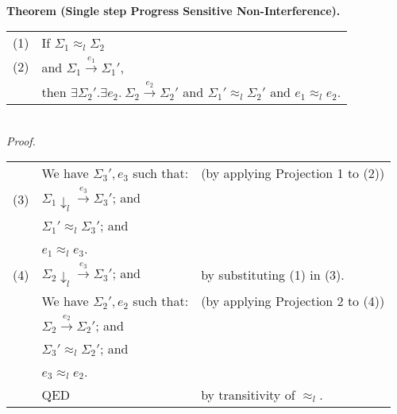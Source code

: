 \documentclass{article}
\newcommand{\ssteparrow}[1]{\overset{#1}{\longrightarrow}}
\newcommand{\sstep}[3]{#2\ssteparrow{#1}#3}
\newcommand{\proj}[2]{#1{\downarrow_{#2}}}
\newcommand{\lequiv}[3]{#2\approx_{#1}#3}
\begin{document}
\\
\textbf{Theorem (Single step Progress Sensitive Non-Interference).}
\\
\begin{tabular}{l@{$\qquad$}l}
  (1) & If $\lequiv{l}{\Sigma_1}{\Sigma_2}$
\\
  (2) & and $\sstep{e_1}{\Sigma_1}{\Sigma_1'}$,
\\
      & then $\exists \Sigma_2'.\exists e_2.~\sstep{e_2}{\Sigma_2}{\Sigma_2'}$
        and $\lequiv{l}{\Sigma_1'}{\Sigma_2'}$
        and $\lequiv{l}{e_1}{e_2}$.
\end{tabular}
\\
\textit{Proof.}
\\
\begin{tabular}{l@{$\qquad$}l@{\qquad}l}
      & We have $\Sigma_3',e_3$ such that:
      & (by applying Projection 1 to (2))
\\
  (3) & $\sstep{e_3}{\proj{\Sigma_1}{l}}{\Sigma_3'}$; and
\\
      & $\lequiv{l}{\Sigma_1'}{\Sigma_3'}$; and
\\
      & $\lequiv{l}{e_1}{e_3}$.
\\
  (4) & $\sstep{e_3}{\proj{\Sigma_2}{l}}{\Sigma_3'}$; and
      & by substituting (1) in (3).
\\
      & We have $\Sigma_2',e_2$ such that:
      & (by applying Projection 2 to (4))
\\
      & $\sstep{e_2}{\Sigma_2}{\Sigma_2'}$; and
\\
      & $\lequiv{l}{\Sigma_3'}{\Sigma_2'}$; and
\\
      & $\lequiv{l}{e_3}{e_2}$.
\\
      & QED
      & by transitivity of $\lequiv{l}{}{}$.
\end{tabular}
\end{document}
